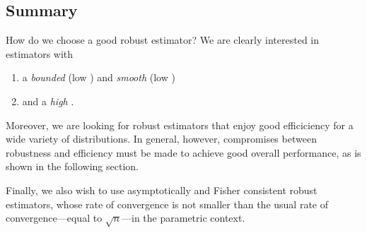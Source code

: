 
\subsection{Summary}

How do we choose a good robust estimator? We are clearly interested in estimators with

\begin{enumerate}
    \item a \emph{bounded} (low )
    and \emph{smooth} (low ) \emph{} 

    \item and a \emph{high }.
\end{enumerate}

Moreover, we are looking for robust estimators that enjoy good efficiciency for
a wide variety of distributions. In general, however, compromises between
robustness and efficiency must be made to achieve good overall performance, as
is shown in the following section.

Finally, we also wish to use asymptotically and Fisher consistent robust
estimators, whose rate of convergence is not smaller than the usual rate of
convergence---equal to $\sqrt{n}$---in the parametric context.


\endinput
